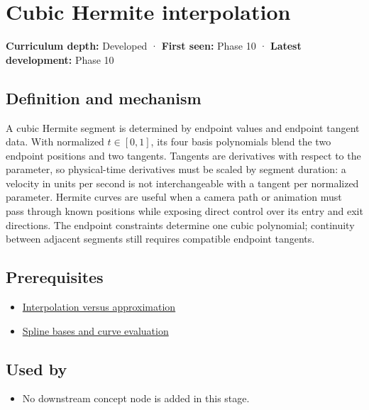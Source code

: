 \hypertarget{appendix-db3aef8f2fd6}{}\label{referencestart:appendix-db3aef8f2fd6}
\section{Cubic Hermite interpolation}\label{appendix-db3aef8f2fd6-cubic-hermite-interpolation}

\textbf{Curriculum depth:} Developed · \textbf{First seen:} Phase 10 · \textbf{Latest development:} Phase 10

\subsection{Definition and mechanism}\label{appendix-db3aef8f2fd6-definition-and-mechanism}

A cubic Hermite segment is determined by endpoint values and endpoint tangent data. With normalized \(t\in[0,1]\), its four basis polynomials blend the two endpoint positions and two tangents. Tangents are derivatives with respect to the parameter, so physical-time derivatives must be scaled by segment duration: a velocity in units per second is not interchangeable with a tangent per normalized parameter. Hermite curves are useful when a camera path or animation must pass through known positions while exposing direct control over its entry and exit directions. The endpoint constraints determine one cubic polynomial; continuity between adjacent segments still requires compatible endpoint tangents.

\subsection{Prerequisites}\label{appendix-db3aef8f2fd6-prerequisites}

\begin{itemize}
\tightlist
\item
  \hyperref[appendix-0c2a5f69851e]{Interpolation versus approximation}
\item
  \hyperref[appendix-f28eeec97a3d]{Spline bases and curve evaluation}
\end{itemize}

\subsection{Used by}\label{appendix-db3aef8f2fd6-used-by}

\begin{itemize}
\tightlist
\item
  No downstream concept node is added in this stage.
\end{itemize}

